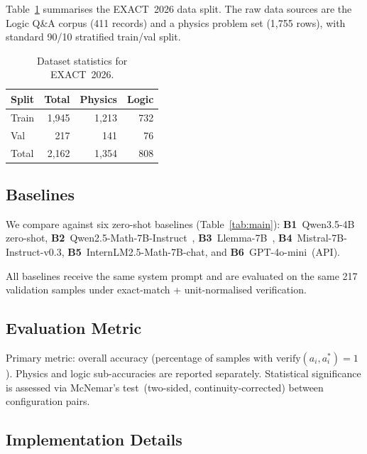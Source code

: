 \documentclass{ieeeaccess}
\newcommand{\basemodelname}{Qwen3.5-4B}
\newcommand{\dataset}{EXACT~2026}
\begin{document}
Table~\ref{tab:dataset} summarises the \dataset{} data split.
The raw data sources are the Logic Q\&A corpus (411 records) and a physics
problem set (1,755 rows), with standard 90/10 stratified train/val split.

\begin{table}[t]
  \centering
  \caption{Dataset statistics for \dataset{}.}
  \label{tab:dataset}
  \begin{tabular}{lrrr}
    \toprule
    Split   & Total & Physics & Logic \\
    \midrule
    Train   & 1,945 & 1,213 & 732 \\
    Val     & 217   & 141   & 76  \\
    \midrule
    Total   & 2,162 & 1,354 & 808 \\
    \bottomrule
  \end{tabular}
\end{table}

\subsection{Baselines}

We compare against six zero-shot baselines (Table~\ref{tab:main}):
\textbf{B1}~\basemodelname{} zero-shot,
\textbf{B2}~Qwen2.5-Math-7B-Instruct~\cite{Yang2024},
\textbf{B3}~Llemma-7B~\cite{Azerbayev2024},
\textbf{B4}~Mistral-7B-Instruct-v0.3,
\textbf{B5}~InternLM2.5-Math-7B-chat, and
\textbf{B6}~GPT-4o-mini~(API).

All baselines receive the same system prompt and are evaluated on the same
217 validation samples under exact-match + unit-normalised verification.

\subsection{Evaluation Metric}

Primary metric: overall accuracy (percentage of samples with
$\mathrm{verify}(a_i, a_i^*) = 1$).
Physics and logic sub-accuracies are reported separately.
Statistical significance is assessed via McNemar's test~(two-sided,
continuity-corrected) between configuration pairs.

\subsection{Implementation Details}
\end{document}
